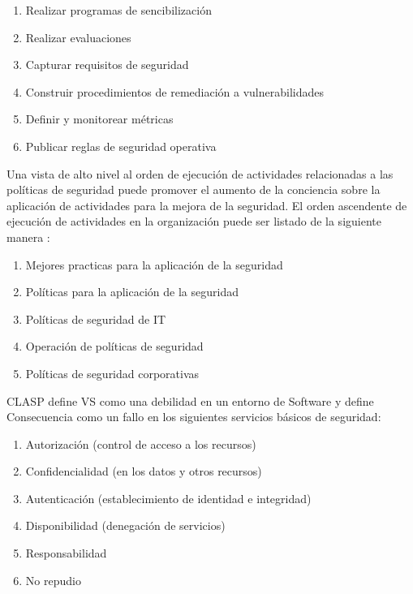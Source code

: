 \documentclass[runningheads,a4paper]{llncs}
\begin{document}
\begin{enumerate}
	\begin{enumerate}
		\item Realizar programas de sencibilización 
		\item Realizar evaluaciones
		\item Capturar requisitos de seguridad
		\item Construir procedimientos de remediación a vulnerabilidades
		\item Definir y monitorear métricas
		\item Publicar reglas de seguridad operativa\\
		
	\end{enumerate}
\end{enumerate} 
Una vista de alto nivel al orden de ejecución de actividades relacionadas a las políticas de seguridad puede promover el aumento de la conciencia sobre la aplicación de actividades para la mejora de la seguridad. El orden ascendente de ejecución de actividades en la organización puede ser listado de la siguiente manera \cite{CLASPConcepts}:
\\
\begin{enumerate}
	\item Mejores practicas para la aplicación de la seguridad
	\item Políticas para la aplicación de la seguridad
	\item Políticas de seguridad de \gls{IT}
	\item Operación de políticas de seguridad
	\item Políticas de seguridad corporativas\\
	
\end{enumerate}
\gls{CLASP} define \gls{VS} como una debilidad en un entorno de \gls{Software} y define Consecuencia como un fallo en los siguientes servicios básicos de seguridad: 
\\
\begin{enumerate}
	\item Autorización (control de acceso a los recursos)
	\item Confidencialidad (en los datos y otros recursos)
	\item Autenticación (establecimiento de identidad e integridad)
	\item Disponibilidad (denegación de servicios)
	\item Responsabilidad
	\item No repudio\\
	
\end{enumerate}
\end{document}
